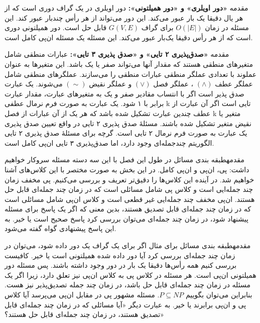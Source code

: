 \begin{itemframe}{مقدمه}
\itm
\textbf{«دور اویلری» و «دور همیلتونی»:}
دور اویلری
در یک گراف دوری است که از هر یال دقیقا یک بار عبور می‌کند. این دور می‌تواند از هر رأس چندبار عبور کند. این مسئله در زمان
$O(|E|)$
برای گراف
$G(V,E)$
قابل حل است. دور همیلتونی
 دوری است که از هر رأس دقیقا یک‌بار عبور می‌کند. این مسئله یک مسئله ان‌پی کامل است.
\end{itemframe}


\begin{itemframe}{مقدمه}
\itm
\textbf{«صدق‌پذیری ۲ تایی» و «صدق پذیری ۳ تایی»: }
عبارات منطقی شامل متغیرهای منطقی هستند که مقدار آنها می‌تواند صفر یا یک باشد. این متغیرها به عنوان عملوند با تعدادی عملگر منطقی عبارات منطقی را می‌سازند. عملگرهای منطقی شامل عملگر عطف
$(\wedge)$
، عملگر فصل
$(\vee)$
و عملگر نقیض
$(\sim)$
می‌شوند.
\sub
یک عبارت صدق پذیر
است اگر با انتساب مقادیر صفر و یک به متغیرهای عبارت، مقدار عبارت برابر با ۱ شود. یک عبارت به صورت فرم نرمال عطفی k تایی است اگر آن عبارت از عطف چندین عبارت تشکیل شده باشد که هر یک از آن عبارات از فصل k متغیر یا نقیض متغیر تشکیل شده باشند.
\sub
مسئلهٔ صدق پذیری ۲ تایی در واقع تعیین صدق پذیری یک عبارت به صورت فرم نرمال ۲ تایی است. گرچه برای مسئلهٔ صدق پذیری ۲ تایی الگوریتم چندجمله‌ای وجود دارد، اما صدق‌پذیری ۳ تایی ان‌پی کامل است.
\end{itemframe}


\begin{itemframe-s}{مقدمه}{طبقه بندی مسائل}
\itm
در طول این فصل با این سه دسته مسئله سروکار خواهیم داشت: پی، ان‌پی و ان‌پی کامل. در این بخش به صورت مختصر با این کلاس‌های آشنا خواهیم شد. در آینده این کلاس‌ها را دقیق‌تر تعریف و بررسی می‌کنیم.
\itm
پی مخفف زمان چند جمله‌ایی است
 و کلاس پی
شامل مسائلی است که در زمان چند جمله‌ای قابل حل هستند.
\itm
ان‌پی مخفف چند جمله‌ایی غیر قطعی
 است و کلاس ان‌پی
شامل مسائلی است که در زمان چند جمله‌ای قابل تصدیق
هستند، بدین معنی که اگر یک پاسخ برای مسئله پیشنهاد شود، در زمان چند جمله‌ای می‌توان بررسی کرد پاسخ صحیح است یا خیر. به این پاسخ پیشنهادی گواه
گفته می‌شود.
\end{itemframe-s}


\begin{itemframe-s}{مقدمه}{طبقه بندی مسائل}
\itm
برای مثال اگر برای یک گراف یک دور داده شود، می‌توان در زمان چند جمله‌ای بررسی کرد آیا دور داده شده همیلتونی است یا خیر. کافیست بررسی کنیم همه رأس‌ها دقیقا یک بار در دور وجود داشته باشند. پس مسئله دور همیلتونی ان‌پی است.
\itm
هر مسئله در کلاس پی به کلاس ان‌پی نیز تعلق دارد، زیرا اگر یک مسئله در زمان چند جمله‌ای قابل حل باشد، در زمان چند جمله تصدیق‌پذیر نیز هست. بنابراین می‌توان بگوییم
$P \subseteq NP$.
\itm
مسئله مشهور پی در مقابل ان‌پی
می‌پرسد آیا کلاس پی و ان‌پی برابرند یا خیر. به عبارت دیگر «آیا مسائلی که در زمان چند جمله‌ای قابل تصدیق هستند، در زمان چند جمله‌ای قابل حل هستند؟»
\end{itemframe-s}


